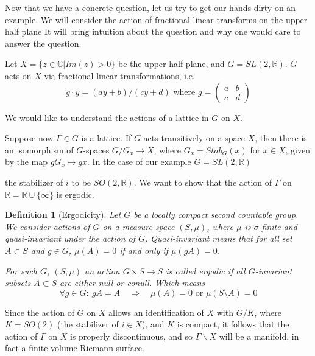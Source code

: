 \documentclass[
  12pt
]{article}
\theoremstyle{break}
\newtheorem{defn}{Definition}[thm]
\theoremstyle{plain}
\newcommand{\G}{\ensuremath{G}\xspace}
\newcommand{\bbr}{\ensuremath{\mathbb{R}}\xspace}
\newcommand{\bbc}{\ensuremath{\mathbb{C}}\xspace}
\newcommand{\sltr}{\ensuremath{SL(2, \mathbb{R})}\xspace}
\begin{document}
  Now that we have a concrete question, let us try to get our hands dirty
  on an example. We will consider the action of fractional linear transforms on
  the upper half plane
  It will bring intuition about the question and why one would care to
  answer the question.

  Let $X = \{z \in \bbc  | Im(z) >0\}$ be the upper half plane, and $G = \sltr$.
  \G acts on $X$ via fractional linear transformations, i.e.
  $$
  g \cdot y = (ay + b)/(cy +d) \text{ where } g= \begin{pmatrix}
    a & b \\
    c & d 
  \end{pmatrix}
  $$

  We would like to understand the actions of a lattice in \G on $X$.

  Suppose now $\Gamma \in G$ is a lattice. 
  If $G$ acts transitively on a space $X$, then there is an isomorphism
  of $G$-spaces $G/G_x \rightarrow X$, where $G_x = Stab_G (x)$ for
  $x \in X$, given by the map $gG_x \mapsto gx$. In the case of our
  example $G = SL(2, \mathbb{R})$

  the stabilizer of $i$ to be $SO(2,\mathbb{R})$.
  We want to show that the action of $\Gamma$ on
  $\bar{\mathbb{R}} = \bbr \cup \{\infty\}$ is ergodic.

  \begin{defn}[Ergodicity]
    Let \G be a locally compact second countable group.
    We consider actions of \G on a measure space $(S, \mu)$, where $\mu$ is
    $\sigma$-finite and quasi-invariant under the action of \G.
    \emph{Quasi-invariant} means that for all set $A \subset S$ and $g \in G$,
    $\mu(A) = 0$ if and only if $\mu(gA) = 0$.

    For such \G, $(S, \mu)$ an action $G \times S \rightarrow S$ is called
    ergodic if all $G$-invariant subsets $A\subset S$ are either null or
    conull.
    Which means 
    $$
    \forall g\in G:\ gA = A \quad \Rightarrow \quad \mu(A)=0 \text{ or } \mu(S\setminus A)=0
    $$
  \end{defn}


  Since the action of $G$ on $X$
  allows an identification of $X$ with $G/K$, where $K = SO(2)$ (the
  stabilizer of $i \in X$), and $K$ is compact, it follows that the
  action of $\Gamma$ on $X$ is properly discontinuous, and so
  $\Gamma\backslash X$ will be a manifold, in fact a finite volume
  Riemann surface.
\end{document}

